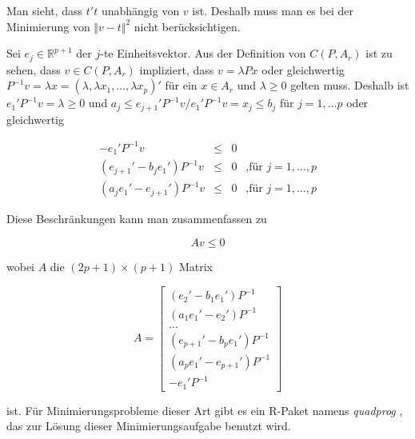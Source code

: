 \documentclass[12pt,a4paper]{article}
\theoremstyle{definition}
\theoremstyle{definition}
\theoremstyle{definition}
\theoremstyle{definition}
\begin{document}
Man sieht, dass $t't$ unabhängig von $v$ ist. Deshalb muss man es bei der Minimierung von $\Vert v-t \Vert^2$ nicht berücksichtigen.
 
Sei $e_j \in \mathbb{R}^{p+1}$ der $j$-te Einheitsvektor. Aus der Definition von $C(P,A_{r})$ ist zu sehen, dass $v \in C(P,A_{r})$ impliziert, dass $v=\lambda P x$ oder gleichwertig $P^{-1}v=\lambda x = (\lambda, \lambda x_1, \ldots , \lambda x_p)'$ für ein $x \in A_{r}$ und $\lambda \geq 0$ gelten muss. Deshalb ist $e_1'P^{-1}v = \lambda \geq 0$ und $a_j \leq e_{j+1}'P^{-1}v/e_1'P^{-1}v = x_j \leq b_j$ für $j = 1, \ldots p$ oder gleichwertig

\begin{eqnarray*}
- e_1' P^{-1} v &\leq & 0 \\
(e_{j+1}' - b_j e_1') P^{-1} v &\leq & 0 ~~\text{ ,für } j = 1, \ldots, p \\
(a_{j} e_1' - e_{j+1}')P^{-1} v &\leq & 0 ~~\text{ ,für } j = 1, \ldots, p
\end{eqnarray*}

Diese Beschränkungen kann man zusammenfassen zu 

\begin{equation*}
A v \leq 0
\end{equation*}

wobei $A$ die $(2p+1) \times (p+1)$ Matrix

\[ 
A = 
\begin{bmatrix} (e_2'-b_1 e_1')P^{-1}  \\ 
				(a_1 e_1' - e_2')P^{-1}  \\  
				\ldots						 \\ 
				(e_{p+1}' - b_p e_1') P^{-1}	\\  
				(a_p e_1' - e_{p+1}')P^{-1}  \\
				-e_1'P^{-1} 
\end{bmatrix}
\]

ist. Für Minimierungsprobleme dieser Art gibt es ein R-Paket namens \textit{quadprog} , das zur Lösung dieser Minimierungsaufgabe benutzt wird.
\end{document}
